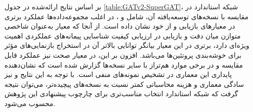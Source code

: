 \begin{table}[h]
	\centering
	\caption{بررسی عملکرد شبکه‌های  و   با ویژگی‌های دودویی}
	\label{table:GATv2-SuperGAT}
	\vspace{3mm}
	
\end{table}


بر اساس نتایج ارائه‌شده در جدول \ref{table:GATv2-SuperGAT}، شبکه  استاندارد در مقایسه با نسخه‌های توسعه‌یافته آن، شامل  و ، در اغلب مجموعه‌داده‌ها عملکرد برتری در معیارهای بازیابی و  از خود نشان داده است. از آنجا که معیار  به‌عنوان شاخصی متوازن میان دقت و بازیابی در ارزیابی کیفیت شناسایی پیمانه‌های عملکردی اهمیت ویژه‌ای دارد، برتری  در این معیار بیانگر توانایی بالاتر آن در استخراج بازنمایی‌های مؤثر برای خوشه‌بندی پروتئین‌ها می‌باشد. افزون بر این، در معیار صحت نیز عملکرد  قابل مقایسه و در برخی موارد هم‌تراز با سایر نسخه‌ها گزارش شده است که نشان‌دهنده پایداری این معماری در تشخیص نمونه‌های منفی است. با توجه به این نتایج و نیز سادگی معماری و هزینه محاسباتی کمتر نسبت به نسخه‌های پیچیده‌تر، می‌توان نتیجه گرفت که شبکه  استاندارد انتخاب مناسب‌تری برای چارچوب پیشنهادی این پژوهش محسوب می‌شود.


